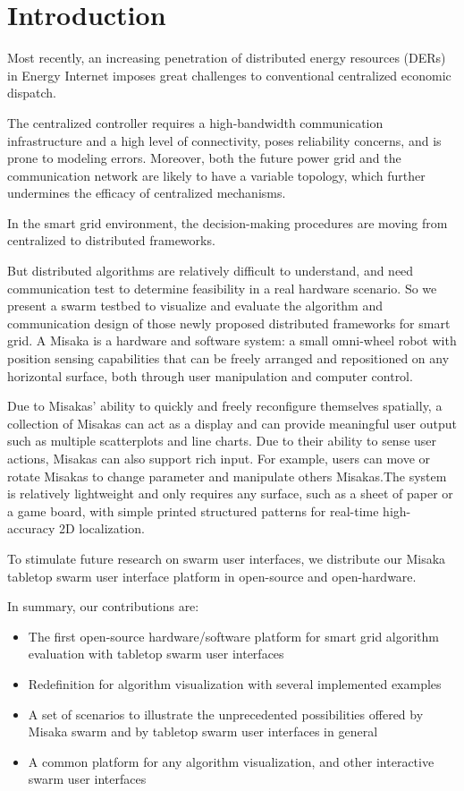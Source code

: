 \documentclass[conference]{IEEEtran}
\begin{document}
\section{Introduction}

Most recently, an increasing penetration of distributed energy resources (DERs) in Energy Internet imposes great challenges to conventional centralized economic dispatch\cite{yan2019consensus}.

The centralized controller requires a high-bandwidth communication infrastructure and a high level of connectivity, poses reliability concerns, and is prone to modeling errors. Moreover, both the future power grid and the communication network are likely to have a variable topology, which further undermines the efficacy of centralized mechanisms\cite{binetti2013distributed}.

In the smart grid environment, the decision-making procedures are moving from centralized to distributed frameworks\cite{yang2011communication}.

But distributed algorithms are relatively difficult to understand, and need communication test to determine feasibility in a real hardware scenario. So we present a swarm testbed to visualize and evaluate the algorithm and communication design of those newly proposed distributed frameworks for smart grid. A Misaka is a hardware and software system: a small omni-wheel robot with position sensing capabilities that can be freely arranged and repositioned on any horizontal surface, both through user manipulation and computer control. 

Due to Misakas’ ability to quickly and freely reconfigure themselves spatially, a collection of Misakas can act as a display and can provide meaningful user output such as multiple scatterplots and line charts. Due to their ability to sense user actions, Misakas can also support rich input. For example, users can move or rotate Misakas to change parameter and manipulate others Misakas.The system is relatively lightweight and only requires any surface, such as a sheet of paper or a game board, with simple printed structured patterns for real-time high-accuracy 2D localization.

To stimulate future research on swarm user interfaces, we distribute our Misaka tabletop swarm user interface platform in open-source and open-hardware.

In summary, our contributions are:

\begin{itemize}
    \item The first open-source hardware/software platform for smart grid algorithm evaluation with tabletop swarm user interfaces
    \item Redefinition for algorithm visualization with several implemented examples
    \item A set of scenarios to illustrate the unprecedented possibilities offered by Misaka swarm and by tabletop swarm user interfaces in general
    \item A common platform for any algorithm visualization, and other interactive swarm user interfaces
\end{itemize}
\end{document}

